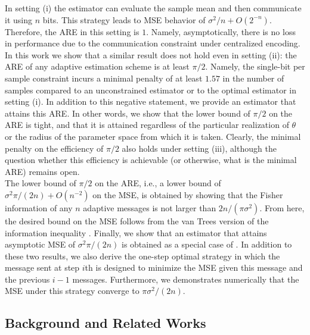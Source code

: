 \documentclass[letterpaper, conference,9pt]{IEEEtran}      %
\begin{document}
In setting (i) the estimator can evaluate the sample mean and then communicate it using $n$ bits. This strategy leads to MSE behavior of $\sigma^2/n + O(2^{-n})$. Therefore, the ARE in this setting is $1$. Namely, asymptotically, there is no loss in performance due to the communication constraint under centralized encoding. In this work we show that a similar result does not hold even in setting (ii): the ARE of any adaptive estimation scheme is at least $\pi/2$. Namely, the single-bit per sample constraint incurs a minimal penalty of at least $1.57$ in the number of samples compared to an unconstrained estimator or to the optimal estimator in setting (i). In addition to this negative statement, we provide an estimator that attains this ARE. In other words, we show that the lower bound of $\pi/2$ on the ARE is tight, and that it is attained regardless of the particular realization of $\theta$ or the radius of the parameter space from which it is taken. Clearly, the minimal penalty on the efficiency of $\pi/2$ also holds under setting (iii), although the question whether this efficiency is achievable (or otherwise, what is the minimal ARE) remains open. 
\\

The lower bound of $\pi/2$ on the ARE, i.e., a lower bound of $\sigma^2\pi/(2n) +O(n^{-2})$ on the MSE, is obtained by showing that the Fisher information of any $n$ adaptive messages is not larger than $2n/(\pi \sigma^2)$. From here, the desired bound on the MSE follows from the van Trees version of the information inequality \cite{gill1995applications}. Finally, we show that an estimator that attains asymptotic MSE of $\sigma^2\pi/(2n)$ is obtained as a special case of \cite[Thm. 4]{polyak1992acceleration}. In addition to these two results, we also derive the one-step optimal strategy in which the message sent at step $i$th is designed to minimize the MSE given this message and the previous $i-1$ messages. Furthermore, we demonstrates numerically that the MSE under this strategy converge to $\pi \sigma^2/(2n)$. %

\subsection*{Background and Related Works}
\end{document}
